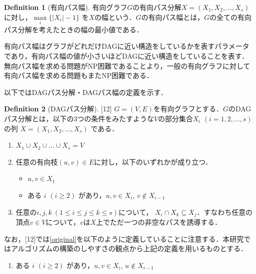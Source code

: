 \documentclass[master]{kuisthesis}		%
\theoremstyle{plain}
\theoremstyle{definition}
\newtheorem{definition*}{Definition}
\begin{document}
\begin{definition*}[有向パス幅]
    有向グラフ$G$の有向パス分解$X=(X_1, X_2,   \dots, X_s)$に対し，$ \underset{i}{\max} \{ |X_i|-1 \}$ を$X$の幅という．$G$の有向パス幅とは，$G$の全ての有向パス分解を考えたときの幅の最小値である．
\end{definition*}

有向パス幅はグラフがどれだけDAGに近い構造をしているかを表すパラメータであり，有向パス幅の値が小さいほどDAGに近い構造をしていることを表す．無向パス幅を求める問題がNP困難であることより，一般の有向グラフに対して有向パス幅を求める問題もまたNP困難である．






以下ではDAGパス分解・DAGパス幅の定義を示す．

\begin{definition*}[DAGパス分解][12]
    $G=(V, E)$を有向グラフとする．$G$のDAGパス分解とは，以下の3つの条件をみたすような$V$の部分集合$X_i$ $(i = 1, 2,  \dots, s)$の列 $X=(X_1, X_2,  \dots, X_s)$ である．
    
    \begin{enumerate}
        \item $ X_1 \cup X_2 \cup \dots \cup X_s = V $ 
        \item 任意の有向枝$(u, v) \in E$に対し，以下のいずれかが成り立つ．
        \begin{itemize}
            \item $u, v \in X_1$
            \item ある $i$ $(i \geq 2)$ があり，$u, v \in X_i$, $v \notin X_{i-1}$ \label{original}
        \end{itemize}
        \item 任意の$ i, j, k\ (1 \leq i \leq j \leq k \leq s)$について， $X_i \cap X_k \subseteq X_j$．すなわち任意の頂点$v \in V$について，$v$は$X$上でただ一つの非空なパスを誘導する．
    \end{enumerate}
    
\end{definition*}

なお，[12]では\ref{original}を以下のように定義していることに注意する．本研究ではアルゴリズムの構築のしやすさの観点から上記の定義を用いるものとする．
\begin{enumerate}
    \item ある $i$ $(i \geq 2)$ があり，$u, v \in X_i$, $u \notin X_{i-1}$ \label{original}
\end{enumerate}
\end{document}
